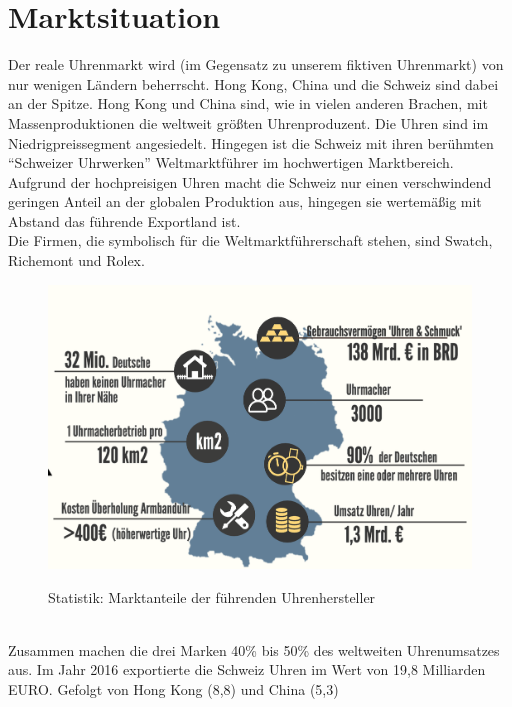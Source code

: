 \section{Marktsituation}
Der reale Uhrenmarkt wird (im Gegensatz zu unserem fiktiven Uhrenmarkt) von nur wenigen Ländern beherrscht. Hong Kong, China und die Schweiz sind dabei an der Spitze. Hong Kong und China sind, wie in vielen anderen Brachen, mit Massenproduktionen die weltweit größten Uhrenproduzent. Die Uhren sind im Niedrigpreissegment angesiedelt. Hingegen ist die Schweiz mit ihren berühmten \enquote{Schweizer Uhrwerken} Weltmarktführer im hochwertigen Marktbereich. Aufgrund der hochpreisigen Uhren macht die Schweiz nur einen verschwindend geringen Anteil an der globalen Produktion aus, hingegen sie wertemäßig mit Abstand das führende Exportland ist. \\   
Die Firmen, die symbolisch für die Weltmarktführerschaft stehen, sind Swatch, Richemont und Rolex.
\\
\begin{figure}[!h]
	\centering
	\includegraphics[scale=0.25]{statistiken/uhrenmarkt_info.png}
	\label{fig:abb1}
	\caption{Statistik: Marktanteile der führenden Uhrenhersteller} 
\end{figure} 
\\
Zusammen machen die drei Marken 40\% bis 50\% des weltweiten Uhrenumsatzes aus. Im Jahr 2016 exportierte die Schweiz Uhren im Wert von 19,8 Milliarden EURO. Gefolgt von Hong Kong (8,8) und China (5,3)
\\
